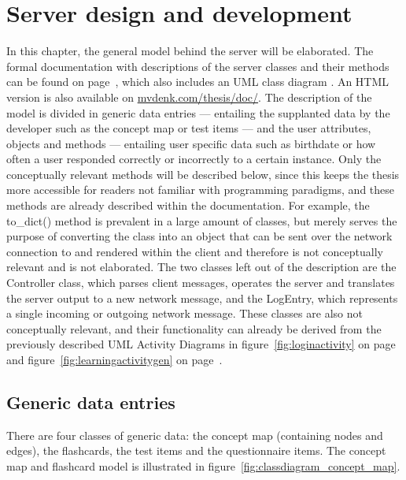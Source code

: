 \chapter{Server design and development}
\label{ch:server}

In this chapter, the general model behind the server will be elaborated. The formal documentation with descriptions of the server classes and their methods can be found on page~\pageref{app:documentation}, which also includes an UML class diagram \cite{uml}. An HTML version is also available on \url{mvdenk.com/thesis/doc/}. The description of the model is divided in generic data entries --- entailing the supplanted data by the developer such as the concept map or test items --- and the user attributes, objects and methods --- entailing user specific data such as birthdate or how often a user responded correctly or incorrectly to a certain instance. Only the conceptually relevant methods will be described below, since this keeps the thesis more accessible for readers not familiar with programming paradigms, and these methods are already described within the documentation. For example, the to\_dict() method is prevalent in a large amount of classes, but merely serves the purpose of converting the class into an object that can be sent over the network connection to and rendered within the client and therefore is not conceptually relevant and is not elaborated. The two classes left out of the description are the Controller class, which parses client messages, operates the server and translates the server output to a new network message, and the LogEntry, which represents a single incoming or outgoing network message. These classes are also not conceptually relevant, and their functionality can already be derived from the previously described UML Activity Diagrams in figure~\ref{fig:loginactivity} on page~\pageref{fig:loginactivity} and figure~\ref{fig:learningactivitygen} on page~\pageref{fig:learningactivitygen}.

\section{Generic data entries}

There are four classes of generic data: the concept map (containing nodes and edges), the flashcards, the test items and the questionnaire items. The concept map and flashcard model is illustrated in figure~\ref{fig:classdiagram_concept_map}.

